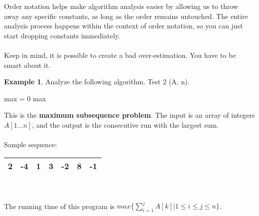 \documentclass[]{article}
\theoremstyle{definition}
\newtheorem{ex}{Example}[section]
\begin{document}
			Order notation helps make algorithm analysis easier by allowing us to throw away any specific constants, as long as the order remains untouched. The entire analysis process happens within the context of order notation, so you can just start dropping constants immediately.
			\\ \\
			Keep in mind, it is possible to create a bad over-estimation. You have to be smart about it.

			\begin{ex}
				Analyze the following algorithm. Test 2 (A, n). \\
				\begin{algorithm}[H]
					max = 0\;
					\Return max
				\end{algorithm}
				
				This is the \textbf{maximum subsequence problem}. The input is an array of integers $A[1\dots n]$, and the output is the consecutive run with the largest sum.
				\\ \\
				Sample sequence:
				\begin{tabular}{|c|c|c|c|c|c|c|}
					\hline 2 & -4 & 1 & 3 & -2 & 8 & -1 \\ \hline
				\end{tabular}
				\\ \\
				The running time of this program is $max \bigg\{ \sum_{i = 1}^{j} A[k] \big| 1 \le i \le j \le n \bigg\}$.
			\end{ex}
\end{document}
